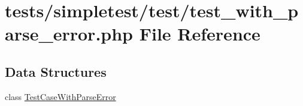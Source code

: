 \hypertarget{test__with__parse__error_8php}{\section{tests/simpletest/test/test\-\_\-with\-\_\-parse\-\_\-error.php File Reference}
\label{test__with__parse__error_8php}
}
\subsection*{Data Structures}
\begin{DoxyCompactItemize}
\item 
class \hyperlink{class_test_case_with_parse_error}{Test\-Case\-With\-Parse\-Error}
\end{DoxyCompactItemize}
